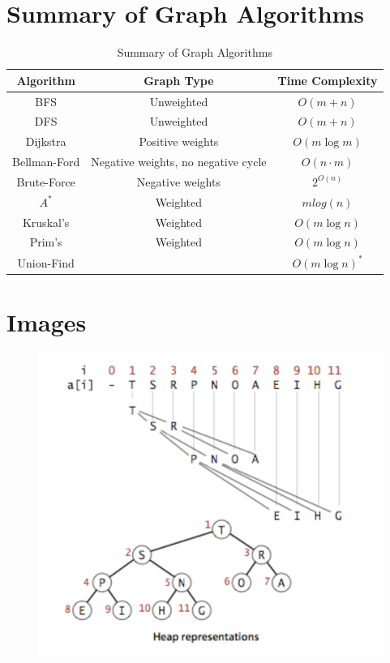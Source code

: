 \documentclass{article}
\begin{document}
\section{Summary of Graph Algorithms}
\begin{table}[!ht]
\centering
\begin{tabular}{|c|c|c|}
\hline
\textbf{Algorithm} & \textbf{Graph Type} & \textbf{Time Complexity} \\
\hline
BFS & Unweighted & \( O(m + n) \) \\
\hline
DFS & Unweighted & \( O(m + n) \)\\
\hline
Dijkstra & Positive weights & \( O(m \log m) \) \\
\hline
Bellman-Ford & Negative weights, no negative cycle & \( O(n \cdot m) \) \\
\hline
Brute-Force & Negative weights & \( 2^{O(n)} \) \\
\hline
$A^*$ &Weighted& $mlog( n )$ \\
\hline
Kruskal's &Weighted& \( O(m \log n) \) \\
\hline
Prim's  &Weighted& \( O(m \log n) \) \\
\hline
Union-Find  && \( O(m \log n)^* \) \\
\hline
\end{tabular}
\caption{Summary of Graph Algorithms}
\end{table}



\section{Images}

\begin{figure}[!ht]
  \centering
  \includegraphics{Images/Heap.png}
  \label{fig:Heap}
\end{figure}
\end{document}
